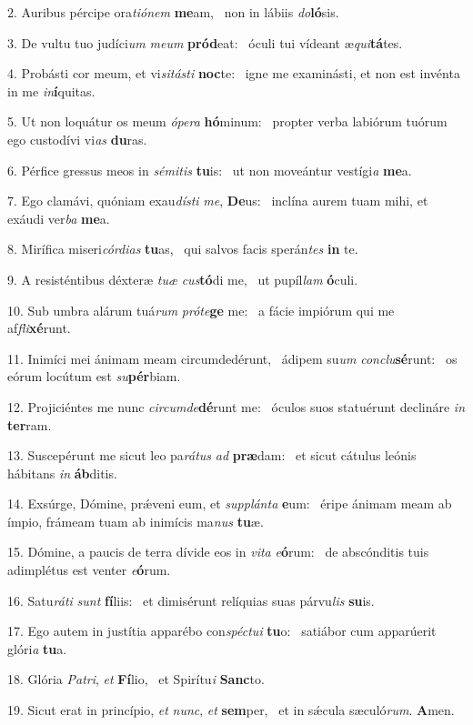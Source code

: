 2. Auribus pércipe ora\textit{ti}\textit{ó}\textit{nem} \textbf{me}am, \ast\  non in lábiis \textit{do}\textbf{ló}sis.\

3. De vultu tuo judíci\textit{um} \textit{me}\textit{um} \textbf{pród}eat: \ast\  óculi tui vídeant æ\textit{qui}\textbf{tá}tes.\

4. Probásti cor meum, et vi\textit{si}\textit{tás}\textit{ti} \textbf{noc}te: \ast\  igne me examinásti, et non est invénta in me \textit{in}\textbf{í}quitas.\

5. Ut non loquátur os meum \textit{ó}\textit{pe}\textit{ra} \textbf{hó}minum: \ast\  propter verba labiórum tuórum ego custodívi vi\textit{as} \textbf{du}ras.\

6. Pérfice gressus meos in \textit{sé}\textit{mi}\textit{tis} \textbf{tu}is: \ast\  ut non moveántur vestígi\textit{a} \textbf{me}a.\

7. Ego clamávi, quóniam exau\textit{dís}\textit{ti} \textit{me}, \textbf{De}us: \ast\  inclína aurem tuam mihi, et exáudi ver\textit{ba} \textbf{me}a.\

8. Mirífica miseri\textit{cór}\textit{di}\textit{as} \textbf{tu}as, \ast\  qui salvos facis sperán\textit{tes} \textbf{in} te.\

9. A resisténtibus déxteræ \textit{tu}\textit{æ} \textit{cus}\textbf{tó}di me, \ast\  ut pupíl\textit{lam} \textbf{ó}culi.\

10. Sub umbra alárum tuá\textit{rum} \textit{pró}\textit{te}\textbf{ge} me: \ast\  a fácie impiórum qui me af\textit{fli}\textbf{xé}runt.\

11. Inimíci mei ánimam meam circumdedérunt, \dag\  ádipem su\textit{um} \textit{con}\textit{clu}\textbf{sé}runt: \ast\  os eórum locútum est \textit{su}\textbf{pér}biam.\

12. Projiciéntes me nunc \textit{cir}\textit{cum}\textit{de}\textbf{dé}runt me: \ast\  óculos suos statuérunt declináre \textit{in} \textbf{ter}ram.\

13. Suscepérunt me sicut leo pa\textit{rá}\textit{tus} \textit{ad} \textbf{præ}dam: \ast\  et sicut cátulus leónis hábitans \textit{in} \textbf{áb}ditis.\

14. Exsúrge, Dómine, prǽveni eum, et \textit{sup}\textit{plán}\textit{ta} \textbf{e}um: \ast\  éripe ánimam meam ab ímpio, frámeam tuam ab inimícis ma\textit{nus} \textbf{tu}æ.\

15. Dómine, a paucis de terra dívide eos in \textit{vi}\textit{ta} \textit{e}\textbf{ó}rum: \ast\  de abscónditis tuis adimplétus est venter \textit{e}\textbf{ó}rum.\

16. Satu\textit{rá}\textit{ti} \textit{sunt} \textbf{fí}liis: \ast\  et dimisérunt relíquias suas párvu\textit{lis} \textbf{su}is.\

17. Ego autem in justítia apparébo con\textit{spéc}\textit{tu}\textit{i} \textbf{tu}o: \ast\  satiábor cum apparúerit glóri\textit{a} \textbf{tu}a.\

18. Glória \textit{Pa}\textit{tri}, \textit{et} \textbf{Fí}lio, \ast\  et Spirítu\textit{i} \textbf{Sanc}to.\

19. Sicut erat in princípio, \textit{et} \textit{nunc}, \textit{et} \textbf{sem}per, \ast\  et in sǽcula sæculó\textit{rum}. \textbf{A}men.\

